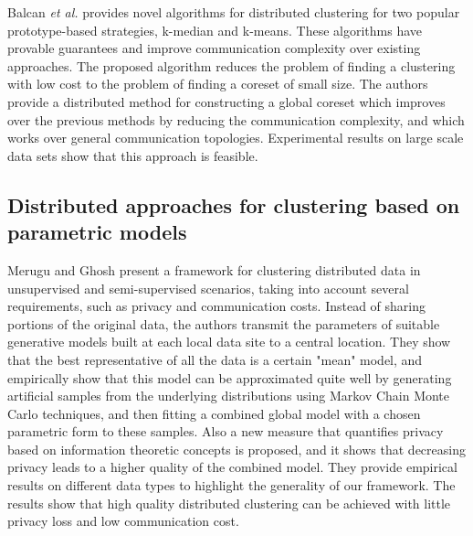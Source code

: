 \documentclass[10pt]{article}
\begin{document}
Balcan \textit{et al.} \citep{BEL13} provides novel algorithms for distributed clustering for two popular prototype-based strategies, k-median and k-means. These algorithms have provable guarantees and improve communication complexity over existing approaches. The proposed algorithm reduces the problem of finding a clustering with low cost to the problem of finding a coreset of small size. The authors provide a distributed method for constructing a global coreset which improves over the previous methods by reducing the communication complexity, and which works over general communication topologies. Experimental results on large scale data sets show that this approach is feasible. 


\subsection{Distributed approaches for clustering based on parametric models}

Merugu and Ghosh \citep{MG03} present a framework for clustering distributed data in unsupervised and semi-supervised scenarios, taking into account several requirements, such as privacy and communication costs. Instead of sharing portions of the original data, the authors transmit the parameters of suitable generative models built at each local data site to a central location. They show that the best representative of all the data is a certain "mean" model, and empirically show that this model can be approximated quite well by generating artificial samples from the underlying distributions using Markov Chain Monte Carlo techniques, and then fitting a combined global model with a chosen parametric form to these samples. Also a new measure that quantifies privacy based on information theoretic concepts is proposed, and it shows that decreasing privacy leads to a higher quality of the combined model. They provide empirical results on different data types to highlight the generality of our framework. The results show that high quality distributed clustering can be achieved with little privacy loss and low communication cost.
\end{document}
